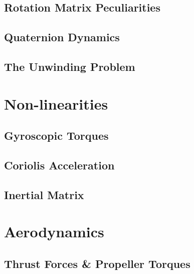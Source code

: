 \subsection{Rotation Matrix Peculiarities}\label{subsec:dynamics.rigidbody.singularity}
\subsection{Quaternion Dynamics}
\label{subsec:dynamics.rigidbody.quaternion}
\subsection{The Unwinding Problem}
\label{subsec:dynamics.rigidbody.unwinding}

\section{Non-linearities}
\label{sec:dynamics.nonlinearities}
\subsection{Gyroscopic Torques}
\label{subsec:dynamics.nonlinearities.gyrotorques}
\subsection{Coriolis Acceleration}
\label{subsec:dynamics.nonlinearities.coriolis}
\subsection{Inertial Matrix}
\label{subsec:dynamics.nonlinearities.inertia}

\section{Aerodynamics}
\label{sec:dynamics.aero}
\subsection{Thrust Forces \& Propeller Torques}
\label{subsec:dynamics.aero.bem}
